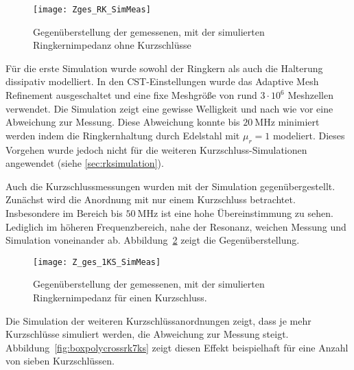 \newpage



\begin{figure}[htb]
	\centering
	\texttt{[image: Zges\_RK\_SimMeas]}
	\caption{Gegen\"uberstellung der gemessenen, mit der simulierten Ringkernimpedanz ohne Kurzschl\"usse}
	\label{fig:boxpolycrossrk}
\end{figure}

F\"ur die erste Simulation wurde sowohl der Ringkern als auch die Halterung dissipativ modelliert. In den CST-Einstellungen wurde das Adaptive Mesh Refinement ausgeschaltet und eine fixe Meshgr\"o\ss{}e von rund $3\cdot10^6$ Meshzellen verwendet. Die Simulation zeigt eine gewisse Welligkeit und nach wie vor eine Abweichung zur Messung. Diese Abweichung konnte bis $\SI{20}{\mega\hertz}$ minimiert werden indem die Ringkernhaltung durch Edelstahl mit $\mu_r = 1$ modeliert.
Dieses Vorgehen wurde jedoch nicht für die weiteren Kurzschluss-Simulationen angewendet (siehe \ref{sec:rksimulation}). 

\par
Auch die Kurzschlussmessungen wurden mit der Simulation gegen\"ubergestellt. Zun\"achst wird die Anordnung mit nur einem Kurzschluss betrachtet. Insbesondere im Bereich bis $\SI{50}{\mega\hertz}$ ist eine hohe \"Ubereinstimmung zu sehen. Lediglich im h\"oheren Frequenzbereich, nahe der Resonanz, weichen Messung und Simulation voneinander ab. Abbildung~\ref{fig:boxpolycrossrk1ks} zeigt die Gegen\"uberstellung.

\begin{figure}[htb]
	\centering
	\texttt{[image: Z\_ges\_1KS\_SimMeas]}
	\caption{Gegen\"uberstellung der gemessenen, mit der simulierten Ringkernimpedanz f\"ur einen Kurzschluss.}
	\label{fig:boxpolycrossrk1ks}
\end{figure}



\newpage



Die Simulation der weiteren Kurzschl\"ussanordnungen zeigt, dass je mehr Kurzschlüsse simuliert werden, die Abweichung zur Messung steigt. Abbildung~\ref{fig:boxpolycrossrk7ks} zeigt diesen Effekt beispielhaft f\"ur eine Anzahl von sieben Kurzschl\"ussen.

